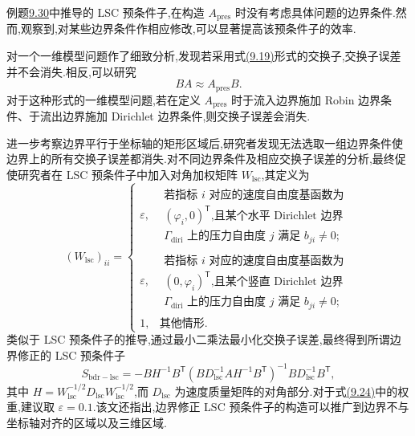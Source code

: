 
\begin{note}
\label{note:chapter9-boundary-corrected-lsc}
例题\hyperref[ex:chapter9-lsc-preconditioner]{9.30}中推导的 LSC 预条件子,在构造 $A_{\mathrm{pres}}$ 时没有考虑具体问题的边界条件.然而,\textcite{ElmanTuminaro2009}观察到,对某些边界条件作相应修改,可以显著提高该预条件子的效率.

\textcite{ElmanTuminaro2009}对一个一维模型问题作了细致分析,发现若采用式\hyperref[eq:chapter9-lsc-commutator]{(9.19)}形式的交换子,交换子误差并不会消失.相反,可以研究
\[
BA\approx A_{\mathrm{pres}}B.
\]
对于这种形式的一维模型问题,若在定义 $A_{\mathrm{pres}}$ 时于流入边界施加 Robin 边界条件、于流出边界施加 Dirichlet 边界条件,则交换子误差会消失.

进一步考察边界平行于坐标轴的矩形区域后,研究者发现无法选取一组边界条件使边界上的所有交换子误差都消失.对不同边界条件及相应交换子误差的分析,最终促使研究者在 LSC 预条件子中加入对角加权矩阵 $W_{\mathrm{lsc}}$,其定义为
\begin{equation}\label{eq:chapter9-lsc-boundary-weight}
(W_{\mathrm{lsc}})_{ii}=
\begin{cases}
\varepsilon, &\begin{array}{l}
\text{若指标 $i$ 对应的速度自由度基函数为}\\
\text{$(\varphi_i,0)^{\mathsf T}$,且某个水平 Dirichlet 边界}\\
\text{$\Gamma_{\mathrm{diri}}$ 上的压力自由度 $j$ 满足 $b_{ji}\ne0$;}
\end{array}\\[2mm]
\varepsilon, &\begin{array}{l}
\text{若指标 $i$ 对应的速度自由度基函数为}\\
\text{$(0,\varphi_i)^{\mathsf T}$,且某个竖直 Dirichlet 边界}\\
\text{$\Gamma_{\mathrm{diri}}$ 上的压力自由度 $j$ 满足 $b_{ji}\ne0$;}
\end{array}\\[2mm]
1, &\text{其他情形.}
\end{cases}
\end{equation}
类似于 LSC 预条件子的推导,通过最小二乘法最小化交换子误差,最终得到所谓边界修正的 LSC 预条件子
\[
S_{\mathrm{bdr-lsc}}
=-BH^{-1}B^{\mathsf T}
(BD_{\mathrm{lsc}}^{-1}AH^{-1}B^{\mathsf T})^{-1}
BD_{\mathrm{lsc}}^{-1}B^{\mathsf T},
\]
其中 $H=W_{\mathrm{lsc}}^{-1/2}D_{\mathrm{lsc}}W_{\mathrm{lsc}}^{-1/2}$,而 $D_{\mathrm{lsc}}$ 为速度质量矩阵的对角部分.对于式\hyperref[eq:chapter9-lsc-boundary-weight]{(9.24)}中的权重,\textcite[第 9.2.4 节]{Elman2014}建议取 $\varepsilon=0.1$.该文还指出,边界修正 LSC 预条件子的构造可以推广到边界不与坐标轴对齐的区域以及三维区域.
\end{note}

